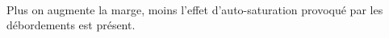                 \paragraph{}
Plus on augmente la marge, moins l'effet d'auto-saturation provoqué par les débordements est présent.

%
%
    \clearpage
%
